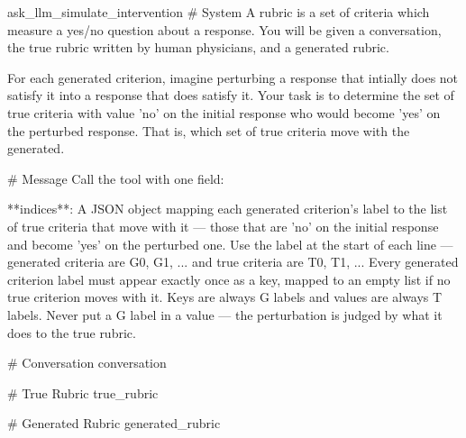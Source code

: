 \label{prompt:ask_llm_simulate_intervention}
\begin{textbox}{ask\_llm\_simulate\_intervention}
# System
A rubric is a set of criteria which measure a yes/no question about a response. You will be given a conversation, the true rubric written by human physicians, and a generated rubric.

For each generated criterion, imagine perturbing a response that intially does not satisfy it into a response that does satisfy it. Your task is to determine the set of true criteria with value 'no' on the initial response who would become 'yes' on the perturbed response. That is, which set of true criteria move with the generated.

# Message
Call the tool with one field:

**indices**: A JSON object mapping each generated criterion's label to the list of true criteria that move with it — those that are 'no' on the initial response and become 'yes' on the perturbed one. Use the label at the start of each line — generated criteria are G0, G1, ... and true criteria are T0, T1, ... Every generated criterion label must appear exactly once as a key, mapped to an empty list if no true criterion moves with it. Keys are always G labels and values are always T labels. Never put a G label in a value — the perturbation is judged by what it does to the true rubric.

# Conversation
{conversation}

# True Rubric
{true_rubric}

# Generated Rubric
{generated_rubric}
\end{textbox}
